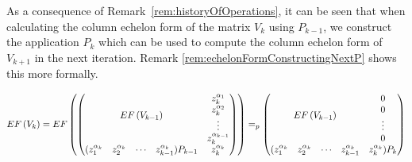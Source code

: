 \documentclass[11pt]{llncs}
\begin{document}



As a consequence of Remark~\ref{rem:historyOfOperations}, it can be seen that when calculating the column echelon form of the matrix $V_k$ using $P_{k-1}$, we construct the application $P_k$ which can be used to compute the column echelon form of $V_{k+1}$ in the next iteration. Remark \ref{rem:echelonFormConstructingNextP} shows this more formally.

\begin{remark}\label{rem:echelonFormConstructingNextP}
    \begin{align*}
        EF\left(V_{k}\right) =
        EF
        \begin{pmatrix}
        \begin{pmatrix}
            \multicolumn{4}{c}{\multirow{4}{*}{$EF\left(V_{k-1}\right)$}} & z_k^{\alpha_1}\\
            & & & & z_k^{\alpha_2}\\
            & & & & \vdots\\
            & & & & z_{k}^{\alpha_{k-1}}\\
            (z_1^{\alpha_{k}} & z_2^{\alpha_{k}}& \cdots & z_{k-1}^{\alpha_{k}})P_{k-1} & z_{k}^{\alpha_k}
        \end{pmatrix}
        \end{pmatrix}
        =_p 
        \begin{pmatrix}
            \multicolumn{4}{c}{\multirow{4}{*}{$EF\left(V_{k-1}\right)$}} & 0\\
            & & & & 0\\
            & & & & \vdots\\
            & & & & 0\\
            (z_1^{\alpha_{k}} & z_2^{\alpha_{k}}& \cdots & z_{k-1}^{\alpha_{k}} & z_{k}^{\alpha_k})P_{k}
        \end{pmatrix}
    \end{align*}
\end{remark}



\end{document}
